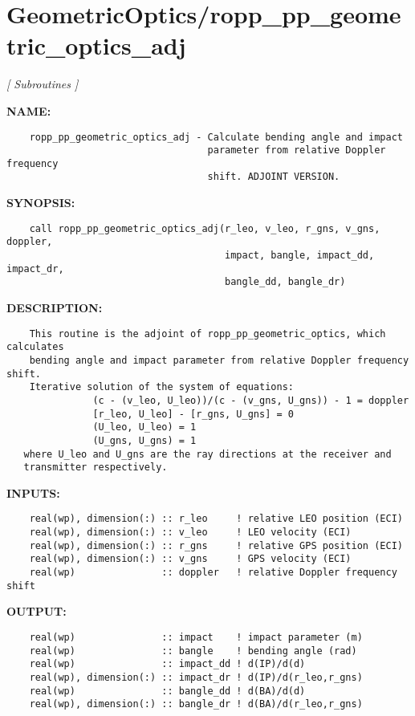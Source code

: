 \section{GeometricOptics/ropp\_pp\_geometric\_optics\_adj}
\textsl{[ Subroutines ]}

\label{ch:robo20}
\label{ch:GeometricOptics_ropp_pp_geometric_optics_adj}
\textbf{NAME:}\hspace{0.08in}\begin{Verbatim}
    ropp_pp_geometric_optics_adj - Calculate bending angle and impact 
                                   parameter from relative Doppler frequency 
                                   shift. ADJOINT VERSION.
\end{Verbatim}
\textbf{SYNOPSIS:}\hspace{0.08in}\begin{Verbatim}
    call ropp_pp_geometric_optics_adj(r_leo, v_leo, r_gns, v_gns, doppler,
                                      impact, bangle, impact_dd, impact_dr, 
                                      bangle_dd, bangle_dr)
\end{Verbatim}
\textbf{DESCRIPTION:}\hspace{0.08in}\begin{Verbatim}
    This routine is the adjoint of ropp_pp_geometric_optics, which calculates 
    bending angle and impact parameter from relative Doppler frequency shift.
    Iterative solution of the system of equations:
               (c - (v_leo, U_leo))/(c - (v_gns, U_gns)) - 1 = doppler
               [r_leo, U_leo] - [r_gns, U_gns] = 0
               (U_leo, U_leo) = 1
               (U_gns, U_gns) = 1
   where U_leo and U_gns are the ray directions at the receiver and 
   transmitter respectively.
\end{Verbatim}
\textbf{INPUTS:}\hspace{0.08in}\begin{Verbatim}
    real(wp), dimension(:) :: r_leo     ! relative LEO position (ECI)
    real(wp), dimension(:) :: v_leo     ! LEO velocity (ECI)  
    real(wp), dimension(:) :: r_gns     ! relative GPS position (ECI)
    real(wp), dimension(:) :: v_gns     ! GPS velocity (ECI)  
    real(wp)               :: doppler   ! relative Doppler frequency shift
\end{Verbatim}
\textbf{OUTPUT:}\hspace{0.08in}\begin{Verbatim}
    real(wp)               :: impact    ! impact parameter (m)
    real(wp)               :: bangle    ! bending angle (rad)
    real(wp)               :: impact_dd ! d(IP)/d(d) 
    real(wp), dimension(:) :: impact_dr ! d(IP)/d(r_leo,r_gns)
    real(wp)               :: bangle_dd ! d(BA)/d(d) 
    real(wp), dimension(:) :: bangle_dr ! d(BA)/d(r_leo,r_gns) 
\end{Verbatim}
